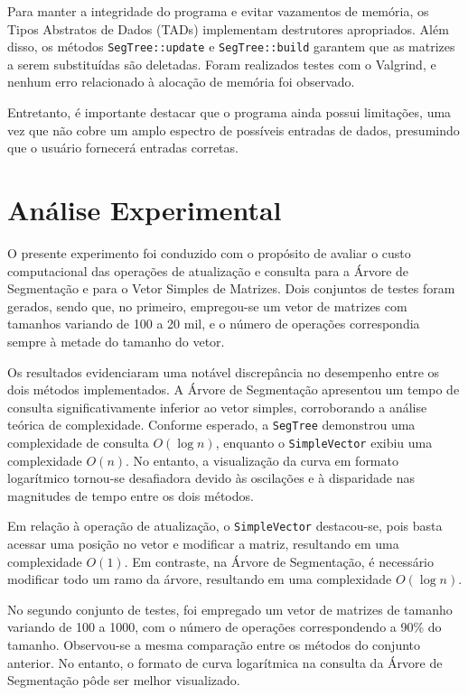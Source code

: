 \documentclass{article}
\begin{document}
Para manter a integridade do programa e evitar vazamentos de memória, os Tipos Abstratos de Dados (TADs) implementam destrutores apropriados. Além disso, os métodos \texttt{SegTree::update} e  \texttt{SegTree::build} garantem que as matrizes a serem substituídas são deletadas. Foram realizados testes com o Valgrind, e nenhum erro relacionado à alocação de memória foi observado.

Entretanto, é importante destacar que o programa ainda possui limitações, uma vez que não cobre um amplo espectro de possíveis entradas de dados, presumindo que o usuário fornecerá entradas corretas. 


\section{Análise Experimental}

O presente experimento foi conduzido com o propósito de avaliar o custo computacional das operações de atualização e consulta para a Árvore de Segmentação e para o Vetor Simples de Matrizes. Dois conjuntos de testes foram gerados, sendo que, no primeiro, empregou-se um vetor de matrizes com tamanhos variando de 100 a 20 mil, e o número de operações correspondia sempre à metade do tamanho do vetor.

Os resultados evidenciaram uma notável discrepância no desempenho entre os dois métodos implementados. A Árvore de Segmentação apresentou um tempo de consulta significativamente inferior ao vetor simples, corroborando a análise teórica de complexidade. Conforme esperado, a \texttt{SegTree} demonstrou uma complexidade de consulta \(O(\log n)\), enquanto o \texttt{SimpleVector} exibiu uma complexidade \(O(n)\). No entanto, a visualização da curva em formato logarítmico tornou-se desafiadora devido às oscilações e à disparidade nas magnitudes de tempo entre os dois métodos.

Em relação à operação de atualização, o \texttt{SimpleVector} destacou-se, pois basta acessar uma posição no vetor e modificar a matriz, resultando em uma complexidade \(O(1)\). Em contraste, na Árvore de Segmentação, é necessário modificar todo um ramo da árvore, resultando em uma complexidade \(O(\log n)\).

No segundo conjunto de testes, foi empregado um vetor de matrizes de tamanho variando de 100 a 1000, com o número de operações correspondendo a 90\% do tamanho. Observou-se a mesma comparação entre os métodos do conjunto anterior. No entanto, o formato de curva logarítmica na consulta da Árvore de Segmentação pôde ser melhor visualizado.
\end{document}
